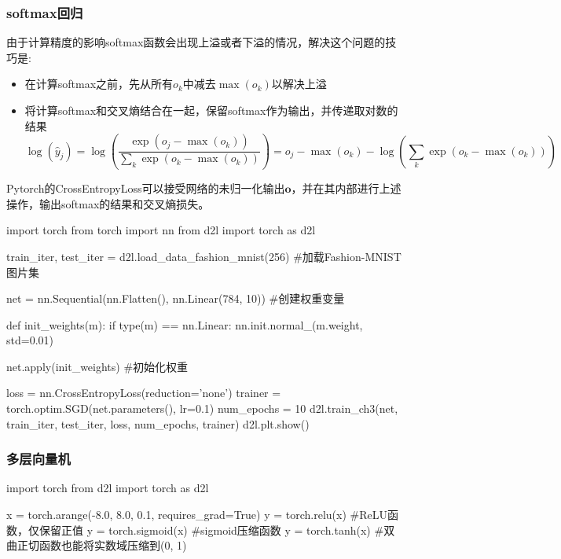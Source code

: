     \subsubsection{softmax回归}
      由于计算精度的影响softmax函数会出现上溢或者下溢的情况，解决这个问题的技巧是:
      \begin{itemize}
        \item 在计算softmax之前，先从所有$o_k$中减去$\max(o_k)$以解决上溢
        \item 将计算softmax和交叉熵结合在一起，保留softmax作为输出，并传递取对数的结果
              \[ \log(\hat{y}_j) = \log(\frac{\exp(o_j-\max{(o_k)})}{\sum_{k}\exp(o_k-\max{(o_k)})}) = o_j-\max(o_k)-\log(\sum_k\exp(o_k-\max(o_k))) \]
      \end{itemize}

      Pytorch的CrossEntropyLoss可以接受网络的未归一化输出$\mathbf{o}$，并在其内部进行上述操作，输出softmax的结果和交叉熵损失。

      \begin{codeblock}[language=python, caption={Softmax}]
        import torch
        from torch import nn
        from d2l import torch as d2l
        
        train_iter, test_iter = d2l.load_data_fashion_mnist(256) #加载Fashion-MNIST图片集
        
        net = nn.Sequential(nn.Flatten(), nn.Linear(784, 10)) #创建权重变量
        
        def init_weights(m):
            if type(m) == nn.Linear:
                nn.init.normal_(m.weight, std=0.01)
        
        net.apply(init_weights) #初始化权重
        
        loss = nn.CrossEntropyLoss(reduction='none')
        trainer = torch.optim.SGD(net.parameters(), lr=0.1)
        num_epochs = 10
        d2l.train_ch3(net, train_iter, test_iter, loss, num_epochs, trainer)
        d2l.plt.show()
      \end{codeblock}

    \subsubsection{多层向量机}
      \begin{codeblock}[language=python, caption={activation function}]
        import torch
        from d2l import torch as d2l

        x = torch.arange(-8.0, 8.0, 0.1, requires_grad=True)
        y = torch.relu(x) #ReLU函数，仅保留正值
        y = torch.sigmoid(x) #sigmoid压缩函数
        y = torch.tanh(x) #双曲正切函数也能将实数域压缩到(0, 1)
      \end{codeblock}

